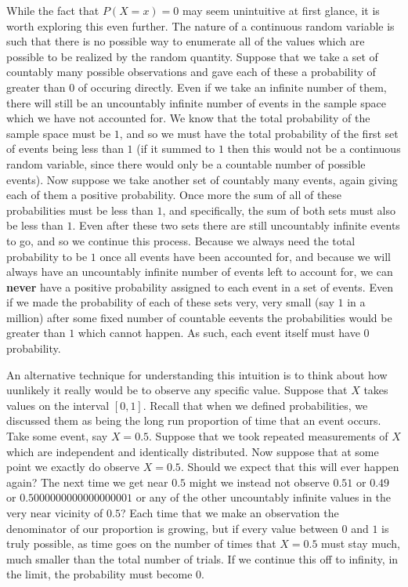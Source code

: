 \documentclass[
  letterpaper,
  DIV=11,
  numbers=noendperiod]{scrreprt}
\begin{document}
While the fact that \(P(X=x) = 0\) may seem unintuitive at first glance,
it is worth exploring this even further. The nature of a continuous
random variable is such that there is no possible way to enumerate all
of the values which are possible to be realized by the random quantity.
Suppose that we take a set of countably many possible observations and
gave each of these a probability of greater than \(0\) of occuring
directly. Even if we take an infinite number of them, there will still
be an uncountably infinite number of events in the sample space which we
have not accounted for. We know that the total probability of the sample
space must be \(1\), and so we must have the total probability of the
first set of events being less than \(1\) (if it summed to \(1\) then
this would not be a continuous random variable, since there would only
be a countable number of possible events). Now suppose we take another
set of countably many events, again giving each of them a positive
probability. Once more the sum of all of these probabilities must be
less than \(1\), and specifically, the sum of both sets must also be
less than \(1\). Even after these two sets there are still uncountably
infinite events to go, and so we continue this process. Because we
always need the total probability to be \(1\) once all events have been
accounted for, and because we will always have an uncountably infinite
number of events left to account for, we can \textbf{never} have a
positive probability assigned to each event in a set of events. Even if
we made the probability of each of these sets very, very small (say
\(1\) in a million) after some fixed number of countable eevents the
probabilities would be greater than \(1\) which cannot happen. As such,
each event itself must have \(0\) probability.

An alternative technique for understanding this intuition is to think
about how uunlikely it really would be to observe any specific value.
Suppose that \(X\) takes values on the interval \([0,1]\). Recall that
when we defined probabilities, we discussed them as being the long run
proportion of time that an event occurs. Take some event, say \(X=0.5\).
Suppose that we took repeated measurements of \(X\) which are
independent and identically distributed. Now suppose that at some point
we exactly do observe \(X=0.5\). Should we expect that this will ever
happen again? The next time we get near \(0.5\) might we instead not
observe \(0.51\) or \(0.49\) or \(0.5000000000000000001\) or any of the
other uncountably infinite values in the very near vicinity of \(0.5\)?
Each time that we make an observation the denominator of our proportion
is growing, but if every value between \(0\) and \(1\) is truly
possible, as time goes on the number of times that \(X=0.5\) must stay
much, much smaller than the total number of trials. If we continue this
off to infinity, in the limit, the probability must become \(0\).
\end{document}
